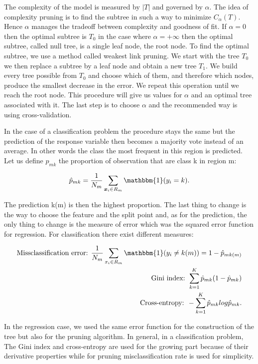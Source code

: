 \documentclass[a4paper,12pt]{article}
\numberwithin{equation}{section}
\begin{document}
The complexity of the model is measured by $|T|$ and governed by $\alpha$. The idea of complexity pruning is to find the subtree in such a way to minimize $C_{\alpha}(T)$. Hence $\alpha$ manages the tradeoff between complexity and goodness of fit. If $\alpha = 0$ then the optimal subtree is $T_0$ in the case where $\alpha = +\infty$ then the optimal subtree, called null tree, is a single leaf node, the root node. To find the optimal subtree, we use a method called weakest link pruning. We start with the tree $T_0$ we then replace a subtree by a leaf node and obtain a new tree $T_1$. We build every tree possible from $T_0$ and choose which of them, and therefore which nodes, produce the smallest decrease in the error. We repeat this operation until we reach the root node. This procedure will give us values for $\alpha$ and an optimal tree associated with it. The last step is to choose $\alpha$ and the recommended way is using cross-validation.

In the case of a classification problem the procedure stays the same but the prediction of the response variable then becomes a majority vote instead of an average. In other words the class the most frequent in this region is predicted. Let us define $\hat{p}_{mk}$ the proportion of observation that are class k in region m:


\begin{equation}\label{eq:8}
\hat{p}_{mk} = \frac{1}{N_m}\sum_{\boldsymbol{x}_i \in R_m} \mathbbm{1}(y_i = k).
\end{equation}

The prediction k(m) is then the highest proportion. The last thing to change is the way to choose the feature and the split point and, as for the prediction, the only thing to change is the measure of error which was the squared error function for regression. For classification there exist different measures:

\begin{align*}
\mbox{Missclassification error: } \frac{1}{N_m}\sum_{x_i \in R_m}\mathbbm{1}(y_i \neq k(m)) = 1- \hat{p}_{mk(m)} \\
\mbox{Gini index: }\sum_{k=1}^K \hat{p}_{mk}(1-\hat{p}_{mk}) \\
\mbox{Cross-entropy: } - \sum_{k=1}^K \hat{p}_{mk} log\hat{p}_{mk}.
\end{align*} 

In the regression case, we used the same error function for the construction of the tree but also for the pruning algorithm. In general, in a classification problem, The Gini index and cross-entropy are used for the growing part because of their derivative properties while for pruning misclassification rate is used for simplicity. 
\end{document}
